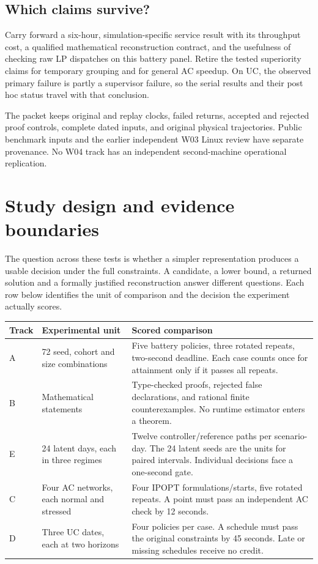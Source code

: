 \documentclass[10pt,letterpaper]{article}
\newcommand{\sect}[1]{\section*{\color{ink}#1}}
\newcommand{\sub}[1]{\subsection*{\color{accent}#1}}
\begin{document}
\sub{Which claims survive?}
Carry forward a six-hour, simulation-specific service result with its throughput cost, a qualified mathematical reconstruction contract, and the usefulness of checking raw LP dispatches on this battery panel. Retire the tested superiority claims for temporary grouping and for general AC speedup. On UC, the observed primary failure is partly a supervisor failure, so the serial results and their post hoc status travel with that conclusion.

The packet keeps original and replay clocks, failed returns, accepted and rejected proof controls, complete dated inputs, and original physical trajectories. Public benchmark inputs and the earlier independent W03 Linux review have separate provenance. No W04 track has an independent second-machine operational replication.
\clearpage
\sect{Study design and evidence boundaries}
The question across these tests is whether a simpler representation produces a usable decision under the full constraints. A candidate, a lower bound, a returned solution and a formally justified reconstruction answer different questions. Each row below identifies the unit of comparison and the decision the experiment actually scores.

\begin{tabularx}{\linewidth}{@{}p{.48in}p{1.85in}X@{}}
\toprule
Track & Experimental unit & Scored comparison\\\midrule
A & 72 seed, cohort and size combinations & Five battery policies, three rotated repeats, two-second deadline. Each case counts once for attainment only if it passes all repeats.\\
B & Mathematical statements & Type-checked proofs, rejected false declarations, and rational finite counterexamples. No runtime estimator enters a theorem.\\
E & 24 latent days, each in three regimes & Twelve controller/reference paths per scenario-day. The 24 latent seeds are the units for paired intervals. Individual decisions face a one-second gate.\\
C & Four AC networks, each normal and stressed & Four IPOPT formulations/starts, five rotated repeats. A point must pass an independent AC check by 12 seconds.\\
D & Three UC dates, each at two horizons & Four policies per case. A schedule must pass the original constraints by 45 seconds. Late or missing schedules receive no credit.\\
\bottomrule
\end{tabularx}
\end{document}
